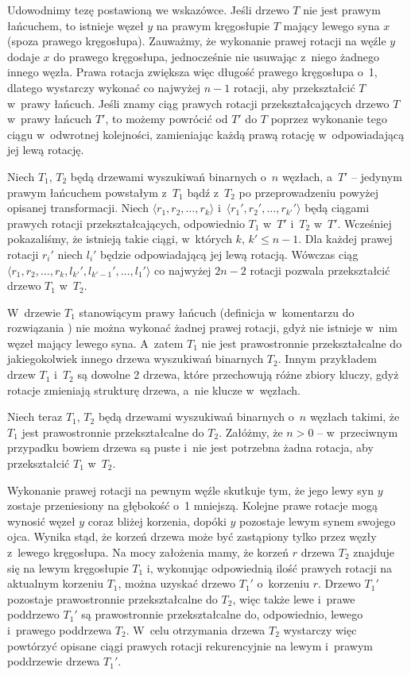 \noindent Udowodnimy tezę postawioną we wskazówce.
Jeśli drzewo $T$ nie jest prawym łańcuchem, to istnieje węzeł $y$ na prawym kręgosłupie $T$ mający lewego syna $x$ (spoza prawego kręgosłupa).
Zauważmy, że wykonanie prawej rotacji na węźle $y$ dodaje $x$ do prawego kręgosłupa, jednocześnie nie usuwając z~niego żadnego innego węzła.
Prawa rotacja zwiększa więc długość prawego kręgosłupa o~1, dlatego wystarczy wykonać co najwyżej $n-1$ rotacji, aby przekształcić $T$ w~prawy łańcuch.
Jeśli znamy ciąg prawych rotacji przekształcających drzewo $T$ w~prawy łańcuch $T'$, to możemy powrócić od $T'$ do $T$ poprzez wykonanie tego ciągu w~odwrotnej kolejności, zamieniając każdą prawą rotację w~odpowiadającą jej lewą rotację.

Niech $T_1$, $T_2$ będą drzewami wyszukiwań binarnych o~$n$ węzłach, a~$T'$ -- jedynym prawym łańcuchem powstałym z~$T_1$ bądź z~$T_2$ po przeprowadzeniu powyżej opisanej transformacji.
Niech $\langle r_1,r_2,\dots,r_k\rangle$ i~$\langle r_1',r_2',\dots,r_{k'}'\rangle$ będą ciągami prawych rotacji przekształcających, odpowiednio $T_1$ w~$T'$ i~$T_2$ w~$T'$.
Wcześniej pokazaliśmy, że istnieją takie ciągi, w~których $k$, $k'\le n-1$.
Dla każdej prawej rotacji $r_i'$ niech $l_i'$ będzie odpowiadającą jej lewą rotacją.
Wówczas ciąg $\langle r_1,r_2,\dots,r_k,l_{k'}',l_{k'-1}',\dots,l_1'\rangle$ co najwyżej $2n-2$ rotacji pozwala przekształcić drzewo $T_1$ w~$T_2$.

\exercise %

\noindent W~drzewie $T_1$ stanowiącym prawy łańcuch (definicja w~komentarzu do rozwiązania ) nie można wykonać żadnej prawej rotacji, gdyż nie istnieje w~nim węzeł mający lewego syna.
A~zatem $T_1$ nie jest prawostronnie przekształcalne do jakiegokolwiek innego drzewa wyszukiwań binarnych $T_2$.
Innym przykładem drzew $T_1$ i~$T_2$ są dowolne 2 drzewa, które przechowują różne zbiory kluczy, gdyż rotacje zmieniają strukturę drzewa, a~nie klucze w~węzłach.

Niech teraz $T_1$, $T_2$ będą drzewami wyszukiwań binarnych o~$n$ węzłach takimi, że $T_1$ jest prawostronnie przekształcalne do $T_2$.
Załóżmy, że $n>0$ -- w~przeciwnym przypadku bowiem drzewa są puste i~nie jest potrzebna żadna rotacja, aby przekształcić $T_1$ w~$T_2$.

Wykonanie prawej rotacji na pewnym węźle skutkuje tym, że jego lewy syn $y$ zostaje przeniesiony na głębokość o~1 mniejszą.
Kolejne prawe rotacje mogą wynosić węzeł $y$ coraz bliżej korzenia, dopóki $y$ pozostaje lewym synem swojego ojca.
Wynika stąd, że korzeń drzewa może być zastąpiony tylko przez węzły z~lewego kręgosłupa.
Na mocy założenia mamy, że korzeń $r$ drzewa $T_2$ znajduje się na lewym kręgosłupie $T_1$ i, wykonując odpowiednią ilość prawych rotacji na aktualnym korzeniu $T_1$, można uzyskać drzewo $T_1'$ o~korzeniu $r$.
Drzewo $T_1'$ pozostaje prawostronnie przekształcalne do $T_2$, więc także lewe i~prawe poddrzewo $T_1'$ są prawostronnie przekształcalne do, odpowiednio, lewego i~prawego poddrzewa $T_2$.
W~celu otrzymania drzewa $T_2$ wystarczy więc powtórzyć opisane ciągi prawych rotacji rekurencyjnie na lewym i~prawym poddrzewie drzewa $T_1'$.

